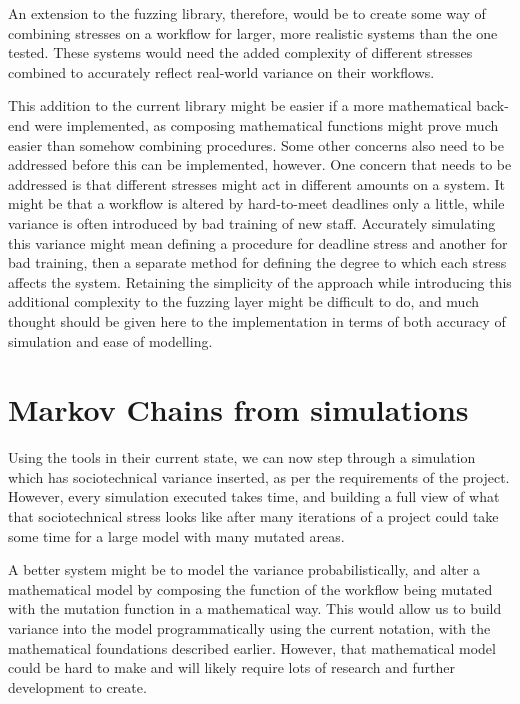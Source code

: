An extension to the fuzzing library, therefore, would be to create some way of combining stresses on a workflow for larger, more realistic systems than the one tested. These systems would need the added complexity of different stresses combined to accurately reflect real-world variance on their workflows. \par

This addition to the current library might be easier if a more mathematical back-end were implemented, as composing mathematical functions might prove much easier than somehow combining procedures. Some other concerns also need to be addressed before this can be implemented, however. One concern that needs to be addressed is that different stresses might act in different amounts on a system. It might be that a workflow is altered by hard-to-meet deadlines only a little, while variance is often introduced by bad training of new staff. Accurately simulating this variance might mean defining a procedure for deadline stress and another for bad training, then a separate method for defining the degree to which each stress affects the system. Retaining the simplicity of the approach while introducing this additional complexity to the fuzzing layer might be difficult to do, and much thought should be given here to the implementation in terms of both accuracy of simulation and ease of modelling. \par

\section{Markov Chains from simulations}
\label{markov_chains}
Using the tools in their current state, we can now step through a simulation which has sociotechnical variance inserted, as per the requirements of the project. However, every simulation executed takes time, and building a full view of what that sociotechnical stress looks like after many iterations of a project could take some time for a large model with many mutated areas. \par

A better system might be to model the variance probabilistically, and alter a mathematical model by composing the function of the workflow being mutated with the mutation function in a mathematical way. This would allow us to build variance into the model programmatically using the current notation, with the mathematical foundations described earlier. However, that mathematical model could be hard to make and will likely require lots of research and further development to create. \par

